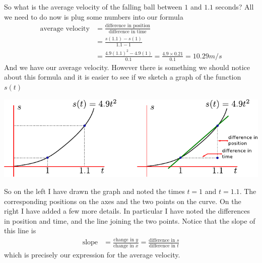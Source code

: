 So what is the average velocity of the falling ball between $1$ and $1.1$
seconds? All we need to do now is plug some numbers into our formula
\begin{align*}
  \mbox{average velocity} &= \frac{\mbox{difference in
position}}{\mbox{difference in time}} \\
  &= \frac{s(1.1) - s(1)}{1.1-1} \\
  &= \frac{4.9 (1.1)^2 - 4.9(1)}{0.1} = \frac{4.9 \times 0.21}{0.1} = 10.29 m/s
\end{align*}
And we have our average velocity. However there is something we should notice
about this formula and it is easier to see if we sketch a graph of the function
$s(t)$
\begin{fig}
\begin{center}
 \includegraphics[width=\textwidth]{vel1}
\end{center}
\end{fig}
So on the left I have drawn the graph and noted the times $t=1$ and $t=1.1$.
The
corresponding positions on the axes and the two points on the curve.  On the
right I have added a few more details. In particular I have noted the
differences in position and time, and the line joining the two points. Notice
that the slope of this line is
\begin{align*}
  \text{slope} &= \frac{\text{change in $y$}}{\text{change in $x$}}
  = \frac{\text{difference in $s$}}{\text{difference in $t$}}
\end{align*}
which is precisely our expression for the average velocity.

